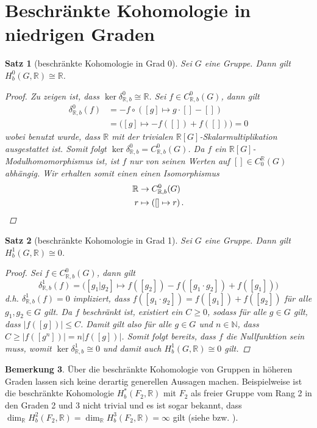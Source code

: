 \documentclass[a4paper,twoside,10pt]{scrreprt}
\newcommand{\N}{\mathbb{N}}
\newcommand{\R}{\mathbb{R}}
\newtheorem{satz}{Satz}[section]
\theoremstyle{definition}
\newtheorem{bemerkung}[satz]{Bemerkung}
\begin{document}
\section{Beschränkte Kohomologie in niedrigen Graden}\label{sec:BoundedCohomInLowDeg}
\begin{satz}[beschränkte Kohomologie in Grad 0]
Sei $G$ eine Gruppe. Dann gilt $H_b^0(G,\R)\cong \R$.
\begin{proof}
Zu zeigen ist, dass $\ker \delta_{\R,b}^0\cong \R$. Sei $f\in C_{\R,b}^0(G)$, dann gilt
\begin{align*}
\delta_{\R,b}^0(f)&=-f\circ \left([g]\mapsto g\cdot[]-[]\right)\\
&=\bigl([g]\mapsto -f\left([]\right)+f\left([]\right)\bigr)=0
\end{align*}
wobei benutzt wurde, dass $\R$ mit der trivialen $\R[G]$-Skalarmultiplikation ausgestattet ist. Somit folgt $\ker \delta_{\R,b}^0=C_{\R,b}^0(G)$.
Da $f$ ein $\R[G]$-Modulhomomorphismus ist, ist $f$ nur von seinen Werten auf $[]\in C_0^{\R}(G)$ abhängig. Wir erhalten somit einen einen Isomorphismus
\begin{align*}
\R&\to C_{\R,b}^0(G)\\
r&\mapsto \left([]\mapsto r\right).\qedhere
\end{align*} 
\end{proof}
\end{satz}
\begin{satz}[beschränkte Kohomologie in Grad 1]
Sei $G$ eine Gruppe. Dann gilt $H_b^1(G,\R)\cong 0$.
\begin{proof}
Sei $f\in C_{\R,b}^0(G)$, dann gilt
\begin{equation*}
\delta_{\R,b}^1(f)=\biggl([g_1|g_2]\mapsto f\left([g_2]\right)-f\left([g_1\cdot g_2]\right)+f\left([g_1]\right)\biggr)
\end{equation*}
d.h. $\delta_{\R,b}^1(f)=0$ impliziert, dass $f([g_1\cdot g_2])=f([g_1])+f([g_2])$ für alle $g_1,g_2\in G$ gilt.
Da $f$ beschränkt ist, existiert ein $C\geq 0$, sodass für alle $g\in G$ gilt, dass $|f([g])|\leq C$.
Damit gilt also für alle $g\in G$ und $n\in \N$, dass $C\geq|f([g^n])|=n|f([g])|$. Somit folgt bereits, dass $f$ die Nullfunktion sein muss, womit $\ker \delta_{\R,b}^1\cong 0$ und damit auch $H_b^1(G,\R)\cong 0$ gilt.
\end{proof}
\end{satz}

\begin{bemerkung}
Über die beschränkte Kohomologie von Gruppen in höheren Graden lassen sich keine derartig generellen Aussagen machen.
Beispielweise ist die beschränkte Kohomologie $H_b^*(F_2,\R)$ mit $F_2$ als freier Gruppe vom Rang 2 in den Graden 2 und 3 nicht trivial und es ist sogar bekannt, dass $\dim_{\R}H_b^2(F_2,\R)=\dim_{\R}H_b^3(F_2,\R)=\infty$ gilt (siehe \cite{mitsumatsu} bzw. \cite{soma}).
\end{bemerkung}
\end{document}
